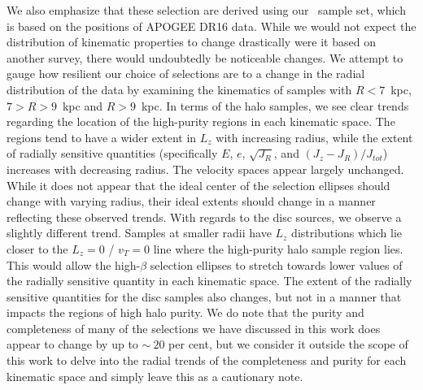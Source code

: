 We also emphasize that these selection are derived using our \survey\ sample set, which is based on the positions of APOGEE DR16 data. While we would not expect the distribution of kinematic properties to change drastically were it based on another survey, there would undoubtedly be noticeable changes. We attempt to gauge how resilient our choice of selections are to a change in the radial distribution of the data by examining the kinematics of samples with $R<7$~kpc,  $7>R>9$~kpc and $R>9$~kpc. In terms of the halo samples, we see clear trends regarding the location of the high-purity regions in each kinematic space. The regions tend to have a wider extent in $L_{z}$ with increasing radius, while the extent of radially sensitive quantities (specifically $E$, $e$, $\sqrt{J_{R}}$, and $(J_{z}-J_{R})/J_{tot}$) increases with decreasing radius. The velocity spaces appear largely unchanged. While it does not appear that the ideal center of the selection ellipses should change with varying radius, their ideal extents should change in a manner reflecting these observed trends. With regards to the disc sources, we observe a slightly different trend. Samples at smaller radii have $L_{z}$ distributions which lie closer to the $L_{z}=0$ / $v_{T}=0$ line where the high-purity halo sample region lies. This would allow the high-$\beta$ selection ellipses to stretch towards lower values of the radially sensitive quantity in each kinematic space. The extent of the radially sensitive quantities for the disc samples also changes, but not in a manner that impacts the regions of high halo purity. We do note that the purity and completeness of many of the selections we have discussed in this work does appear to change by up to $\sim~20$ per cent, but we consider it outside the scope of this work to delve into the radial trends of the completeness and purity for each kinematic space and simply leave this as a cautionary note.

